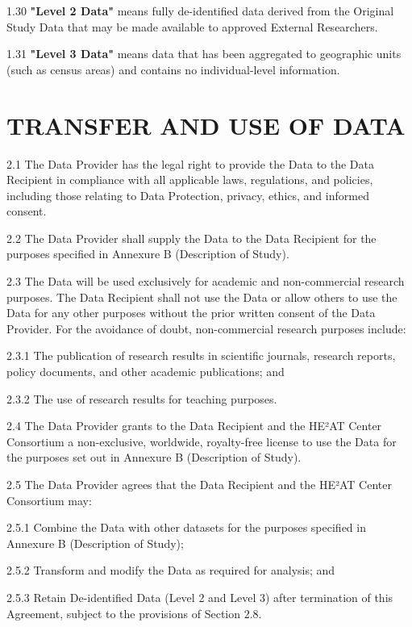 \documentclass[12pt,letterpaper]{article}
\newcommand{\added}[1]{\textcolor{addcolor}{#1}}
\begin{document}
\added{1.30 \textbf{"Level 2 Data"} means fully de-identified data derived from the Original Study Data that may be made available to approved External Researchers.}

\added{1.31 \textbf{"Level 3 Data"} means data that has been aggregated to geographic units (such as census areas) and contains no individual-level information.}

\section{TRANSFER AND USE OF DATA}

2.1 The Data Provider has the legal right to provide the Data to the Data Recipient in compliance with all applicable laws, regulations, and policies, including those relating to Data Protection, privacy, ethics, and informed consent. 

2.2 The Data Provider shall supply the Data to the Data Recipient for the purposes specified in Annexure B (Description of Study). 

2.3 The Data will be used exclusively for academic and non-commercial research purposes. The Data Recipient shall not use the Data or allow others to use the Data for any other purposes without the prior written consent of the Data Provider. For the avoidance of doubt, non-commercial research purposes include:

2.3.1 The publication of research results in scientific journals, research reports, policy documents, and other academic publications; and

2.3.2 The use of research results for teaching purposes.

2.4 The Data Provider grants to the Data Recipient and the HE²AT Center Consortium a non-exclusive, worldwide, royalty-free license to use the Data for the purposes set out in Annexure B (Description of Study). 

2.5 The Data Provider agrees that the Data Recipient and the HE²AT Center Consortium may:

2.5.1 Combine the Data with other datasets for the purposes specified in Annexure B (Description of Study);

2.5.2 Transform and modify the Data as required for analysis; and

2.5.3 Retain De-identified Data (Level 2 and Level 3) after termination of this Agreement, subject to the provisions of Section 2.8.
\end{document}
